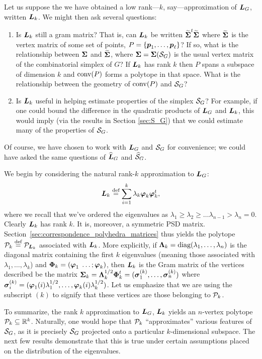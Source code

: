 Let us suppose the we have obtained a low rank---$k$, say---approximation of $\L_G$, written $\L_k$. We might then ask several questions: 
\begin{enumerate}
	\item Is $\L_k$ still a gram matrix? That is, can $\L_k$ be written $\tSv^\tp\tSv$ where $\tSv$ is the vertex matrix of some set of points, $P=\{\p_1,\dots,\p_\ell\}$? If so, what is the relationship between $\Sv$ and $\tSv$, where $\Sv=\Sv(\splx_G)$ is the usual vertex matrix of the combinatorial simplex of $G$? If $\L_k$ has rank $k$ then $P$ spans a subspace of dimension $k$ and $\conv(P)$ forms a polytope in that space. What is the relationship between the geometry of $\conv(P)$ and $\splx_G$?
	\item Is $\L_k$ useful in helping estimate properties of the simplex $\splx_G$? For example, if one could bound the difference in the quadratic products of $\L_G$ and $\L_k$, this would imply (via the results in Section \ref{sec:S_G}) that we could estimate many of the properties of $\splx_G$. 
\end{enumerate}

Of course, we have chosen to work with $\L_G$ and $\splx_G$ for convenience; we could have asked the same questions of $\Ln_G$ and $\splxn_G$. 

We begin by considering the natural rank-$k$ approximation to $\L_G$: 
\begin{equation*}
\L_k\equiv \sum_{i=1}^k \lambda_k\vp_k\vp_k^\tp,
\end{equation*}
where we recall that  we've ordered  the eigenvalues  as $\lambda_1\geq \lambda_2\geq \dots\lambda_{n-1}>\lambda_n=0$. 
Clearly $\L_k$ has rank $k$.  It is, moreover, a symmetric PSD matrix.  Section~\ref{sec:correspondence_polyhedra_matrices} thus yields the polytope $\P_k\equiv \P_{\L_k}$ associated  with $\L_k$. More  explicitly, if 
$\Eval_k=\diag(\lambda_1,\dots,\lambda_n)$ is the diagonal  matrix containing the first $k$  eigenvalues (meaning those  associated  with  $\lambda_1,\dots,\lambda_k$) and $\Eig_k = (\vp_1\;\dots;\vp_k)$, then $\L_k$ is the Gram matrix of the vertices described be the matrix $\Sv_k = \Eval_k^{1/2}\Eig_k^\tp=(\sv_1^\k,\dots,\sv_n^\k)$ where $\sv_i^\k=(\vp_1(i)\lambda_1^{1/2},\dots,\vp_k(i)\lambda_k^{1/2})$. Let us emphasize that we  are using  the subscript $(k)$ to signify that these vertices are  those belonging to  $\P_k$. 

To  summarize, the rank $k$ approximation to $\L_G$, $\L_k$  yields an  $n$-vertex polytope  $\P_k\subset\R^k$. Naturally, one would hope that $\P_k$    ``approximates'' various features of $\splx_G$, as it is precisely $\splx_G$ projected  onto a particular $k$-dimensional subspace. The next few results  demonstrate that this is true under certain  assumptions placed on the distribution of the eigenvalues. 

